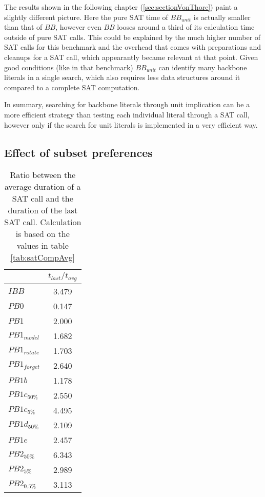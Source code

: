 The results shown in the following chapter (\ref{sec:sectionVonThore}) paint a slightly different picture. Here the pure SAT time of $BB_{unit}$ is actually smaller than that of $BB$, however even $BB$ looses around a third of its calculation time outside of pure SAT calls. This could be explained by the much higher number of SAT calls for this benchmark and the overhead that comes with preparations and cleanups for a SAT call, which appearantly became relevant at that point. Given good conditions (like in that benchmark) $BB_{unit}$ can identify many backbone literals in a single search, which also requires less data structures around it compared to a complete SAT computation.

In summary, searching for backbone literals through unit implication can be a more efficient strategy than testing each individual literal through a SAT call, however only if the search for unit literals is implemented in a very efficient way. %

\subsection{Effect of subset preferences}

\begin{wraptable}{r}{5cm} %
\center
\begin{tabular}{l| c }
 & $t_{last}/t_{avg}$  \\
\hline
$IBB$ & 3.479 \\
$PB0$ & 0.147 \\
$PB1$ & 2.000 \\
$PB1_{model}$ & 1.682 \\
$PB1_{rotate}$ & 1.703 \\
$PB1_{forget}$ & 2.640 \\
$PB1b$ & 1.178 \\
$PB1c_{50\%}$ & 2.550 \\
$PB1c_{5\%}$ & 4.495 \\
$PB1d_{50\%}$ & 2.109 \\
$PB1e$ & 2.457 \\
$PB2_{50\%}$ & 6.343 \\
$PB2_{5\%}$ & 2.989 \\
$PB2_{0.5\%}$ & 3.113 \\
\end{tabular}
\caption[Comparative duration of last SAT call]{Ratio between the average duration of a SAT call and the duration of the last SAT call. Calculation is based on the values in table \ref{tab:satCompAvg}}
\label{tab:lastTimeToAvgTime}
\end{wraptable}

